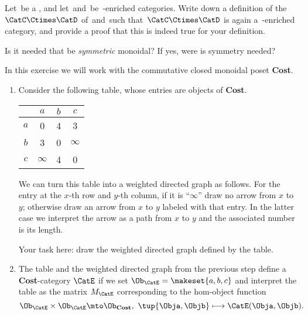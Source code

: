 
\begin{gradedexercise}
    \label{ex:ProductOfEnrichedCats}
    Let~\CatV be a , and let~\CatC and~\CatD be~\CatV-enriched categories.
    Write down a definition of the ~$\CatC \Ctimes \CatD$ of~\CatC and~\CatD such that~$\CatC \Ctimes \CatD$ is again a~\CatV-enriched category, and provide a proof that this is indeed true for your definition.

    Is it needed that \CatV be \emph{symmetric} monoidal?
    If yes, were is symmetry needed?
\end{gradedexercise}



\begin{gradedexercise}
    \label{ex:HwkCostMatrices}

In this exercise we will work with the commutative closed monoidal poset \textbf{Cost}. 

\begin{enumerate}
\item Consider the following table, whose entries are objects of \textbf{Cost}. 

\begin{center}
\begin{tabular}{c|ccc}
 & $a$ & $b$ & $c$ \\
\hline 
$a$ & 0 & 4 & 3 \\
$b$ & 3 & 0 & $\infty$ \\
$c$ & $\infty$ & 4 & 0 
\end{tabular}
\end{center}

We can turn this table into a weighted directed graph as follows. For the entry at the $x$-th row and $y$-th column, if it is ``$\infty$'' draw no arrow from $x$ to $y$; otherwise draw an arrow from $x$ to $y$ labeled with that entry. In the latter case we interpret the arrow as a path from $x$ to $y$ and the associated number is its length. 

Your task here: draw the weighted directed graph defined by the table. 



\item The table and the weighted directed graph from the previous step define a \textbf{Cost}-category $\CatE$ if we set $\Ob_\CatE = \makeset{a, b, c}$ and interpret the table as the matrix $M_\CatE$ corresponding to the hom-object function
\begin{equation}
\Ob_\CatE \times \Ob_\CatE \mto \Ob_\textbf{Cost}, \ \tup{\Obja, \Objb} \longmapsto \CatE(\Obja, \Objb).
\end{equation}



\end{enumerate}
\end{gradedexercise}
